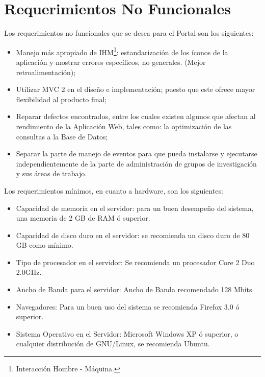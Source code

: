 \section{Requerimientos No Funcionales}
Los requerimientos no funcionales que se desea para el Portal son los siguientes:
\begin{indentar}
\begin{itemize}
\item Manejo m\'as apropiado de IHM\footnote{Interacci\'on Hombre - M\'aquina.}: estandarizaci\'on de los \'iconos de la aplicaci\'on y mostrar errores espec\'ificos, no generales. (Mejor retroalimentaci\'on);
\item Utilizar MVC 2 en el dise\~no e implementaci\'on; puesto que este ofrece mayor flexibilidad al producto final;
\item Reparar defectos encontrados, entre los cuales existen algunos que afectan al rendimiento de la Aplicaci\'on Web, tales como: la optimizaci\'on de las consultas a la Base de Datos;
\item Separar la parte de manejo de eventos para que pueda instalarse y ejecutarse independientemente de la parte de administraci\'on de grupos de investigaci\'on y sus \'areas de trabajo.
\end{itemize}
Los requerimientos m\'inimos, en cuanto a hardware, son los siguientes:
\begin{itemize}
\item Capacidad de memoria en el servidor: para un buen desempe\~no del sistema, una memoria de 2 GB de RAM \'o superior.
\item Capacidad de disco duro en el servidor: se recomienda un disco duro de 80 GB como m\'inimo.
\item Tipo de procesador en el servidor: Se recomienda un procesador Core 2 Duo 2.0GHz.
\item Ancho de Banda para el servidor: Ancho de Banda recomendado 128 Mbits.
\item Navegadores: Para un buen uso del sistema se recomienda Firefox 3.0 \'o superior.
\item Sistema Operativo en el Servidor: Microsoft Windows XP \'o superior, o cualquier distribuci\'on de GNU/Linux, se recomienda Ubuntu.
\end{itemize}
\end{indentar}

